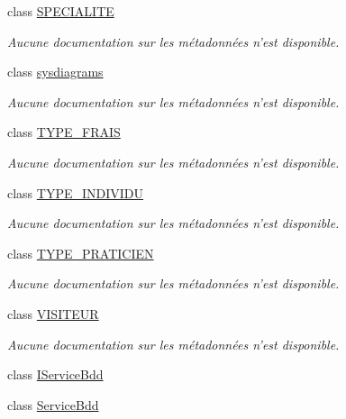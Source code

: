 \begin{DoxyCompactItemize}
class \hyperlink{class_model_1_1_s_p_e_c_i_a_l_i_t_e}{S\-P\-E\-C\-I\-A\-L\-I\-T\-E}
\begin{DoxyCompactList}\small\item\em Aucune documentation sur les métadonnées n'est disponible. \end{DoxyCompactList}\item 
class \hyperlink{class_model_1_1sysdiagrams}{sysdiagrams}
\begin{DoxyCompactList}\small\item\em Aucune documentation sur les métadonnées n'est disponible. \end{DoxyCompactList}\item 
class \hyperlink{class_model_1_1_t_y_p_e___f_r_a_i_s}{T\-Y\-P\-E\-\_\-\-F\-R\-A\-I\-S}
\begin{DoxyCompactList}\small\item\em Aucune documentation sur les métadonnées n'est disponible. \end{DoxyCompactList}\item 
class \hyperlink{class_model_1_1_t_y_p_e___i_n_d_i_v_i_d_u}{T\-Y\-P\-E\-\_\-\-I\-N\-D\-I\-V\-I\-D\-U}
\begin{DoxyCompactList}\small\item\em Aucune documentation sur les métadonnées n'est disponible. \end{DoxyCompactList}\item 
class \hyperlink{class_model_1_1_t_y_p_e___p_r_a_t_i_c_i_e_n}{T\-Y\-P\-E\-\_\-\-P\-R\-A\-T\-I\-C\-I\-E\-N}
\begin{DoxyCompactList}\small\item\em Aucune documentation sur les métadonnées n'est disponible. \end{DoxyCompactList}\item 
class \hyperlink{class_model_1_1_v_i_s_i_t_e_u_r}{V\-I\-S\-I\-T\-E\-U\-R}
\begin{DoxyCompactList}\small\item\em Aucune documentation sur les métadonnées n'est disponible. \end{DoxyCompactList}\item 
class \hyperlink{class_model_1_1_i_service_bdd}{I\-Service\-Bdd}
\item 
class \hyperlink{class_model_1_1_service_bdd}{Service\-Bdd}
\end{DoxyCompactItemize}
